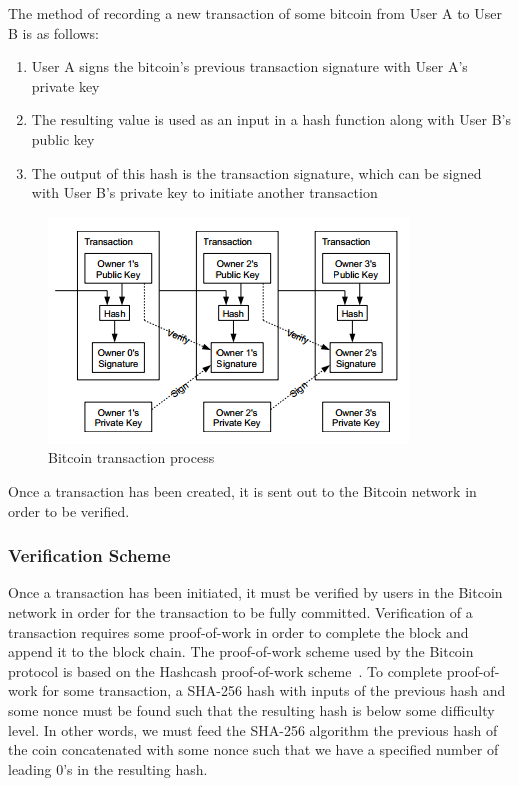 \documentclass[11pt]{article}
\begin{document}
\begin{minipage}{\linewidth}
The method of recording a new transaction of some bitcoin from User A to User
B is as follows:
\begin{enumerate}
    \item User A signs the bitcoin's previous transaction signature with User
        A's private key
    \item The resulting value is used as an input in a hash function along
        with User B's public key
    \item The output of this hash is the transaction signature, which can be
        signed with User B's private key to initiate another transaction
\end{enumerate}
\end{minipage}
\begin{figure}[H]
    \caption{Bitcoin transaction process~\cite{nakamoto08}}
    \centering
        \includegraphics{figures/transaction.png}
\end{figure}

Once a transaction has been created, it is sent out to the Bitcoin network in
order to be verified.

\subsubsection{Verification Scheme}
Once a transaction has been initiated, it must be verified by users in the
Bitcoin network in order for the transaction to be fully committed. Verification
of a transaction requires some proof-of-work in order to complete the block and
append it to the block chain. The proof-of-work scheme used by the Bitcoin
protocol is based on the Hashcash proof-of-work scheme~\cite{back02}. 
To complete proof-of-work for some transaction, a
SHA-256 hash with inputs of the previous hash and some nonce must be found such
that the resulting hash is below some difficulty level. In other words, we must
feed the SHA-256 algorithm the previous hash of the coin concatenated with some
nonce such that we have a specified number of leading 0's in the resulting hash.
\end{document}
